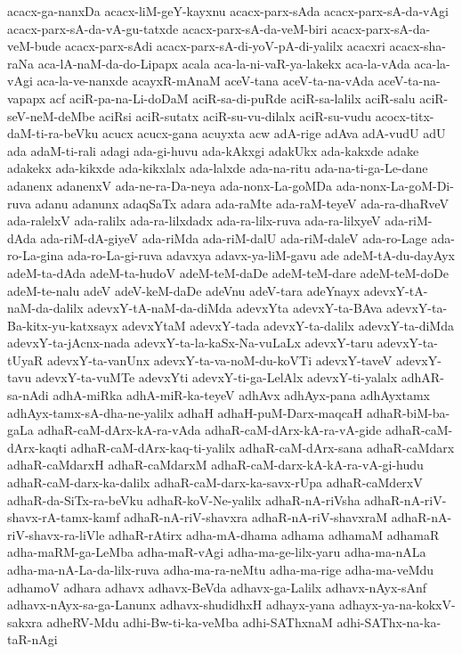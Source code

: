 {acacx-ga-nanxDa
acacx-liM-geY-kayxnu
acacx-parx-sAda
acacx-parx-sA-da-vAgi
acacx-parx-sA-da-vA-gu-tatxde
acacx-parx-sA-da-veM-biri
acacx-parx-sA-da-veM-bude
acacx-parx-sAdi
acacx-parx-sA-di-yoV-pA-di-yalilx
acacxri
acacx-sha-raNa
aca-lA-naM-da-do-Lipapx
acala
aca-la-ni-vaR-ya-lakekx
aca-la-vAda
aca-la-vAgi
aca-la-ve-nanxde
acayxR-mAnaM
aceV-tana
aceV-ta-na-vAda
aceV-ta-na-vapapx
acf
aciR-pa-na-Li-doDaM
aciR-sa-di-puRde
aciR-sa-lalilx
aciR-salu
aciR-seV-neM-deMbe
aciRsi
aciR-sutatx
aciR-su-vu-dilalx
aciR-su-vudu
acocx-titx-daM-ti-ra-beVku
acucx
acucx-gana
acuyxta
acw
adA-rige
adAva
adA-vudU
adU
ada
adaM-ti-rali
adagi
ada-gi-huvu
ada-kAkxgi
adakUkx
ada-kakxde
adake
adakekx
ada-kikxde
ada-kikxlalx
ada-lalxde
ada-na-ritu
ada-na-ti-ga-Le-dane
adanenx
adanenxV
ada-ne-ra-Da-neya
ada-nonx-La-goMDa
ada-nonx-La-goM-Di-ruva
adanu
adanunx
adaqSaTx
adara
ada-raMte
ada-raM-teyeV
ada-ra-dhaRveV
ada-ralelxV
ada-ralilx
ada-ra-lilxdadx
ada-ra-lilx-ruva
ada-ra-lilxyeV
ada-riM-dAda
ada-riM-dA-giyeV
ada-riMda
ada-riM-dalU
ada-riM-daleV
ada-ro-Lage
ada-ro-La-gina
ada-ro-La-gi-ruva
adavxya
adavx-ya-liM-gavu
ade
adeM-tA-du-dayAyx
adeM-ta-dAda
adeM-ta-hudoV
adeM-teM-daDe
adeM-teM-dare
adeM-teM-doDe
adeM-te-nalu
adeV
adeV-keM-daDe
adeVnu
adeV-tara
adeYnayx
adevxY-tA-naM-da-dalilx
adevxY-tA-naM-da-diMda
adevxYta
adevxY-ta-BAva
adevxY-ta-Ba-kitx-yu-katxsayx
adevxYtaM
adevxY-tada
adevxY-ta-dalilx
adevxY-ta-diMda
adevxY-ta-jAcnx-nada
adevxY-ta-la-kaSx-Na-vuLaLx
adevxY-taru
adevxY-ta-tUyaR
adevxY-ta-vanUnx
adevxY-ta-va-noM-du-koVTi
adevxY-taveV
adevxY-tavu
adevxY-ta-vuMTe
adevxYti
adevxY-ti-ga-LelAlx
adevxY-ti-yalalx
adhAR-sa-nAdi
adhA-miRka
adhA-miR-ka-teyeV
adhAvx
adhAyx-pana
adhAyxtamx
adhAyx-tamx-sA-dha-ne-yalilx
adhaH
adhaH-puM-Darx-maqcaH
adhaR-biM-ba-gaLa
adhaR-caM-dArx-kA-ra-vAda
adhaR-caM-dArx-kA-ra-vA-gide
adhaR-caM-dArx-kaqti
adhaR-caM-dArx-kaq-ti-yalilx
adhaR-caM-dArx-sana
adhaR-caMdarx
adhaR-caMdarxH
adhaR-caMdarxM
adhaR-caM-darx-kA-kA-ra-vA-gi-hudu
adhaR-caM-darx-ka-dalilx
adhaR-caM-darx-ka-savx-rUpa
adhaR-caMderxV
adhaR-da-SiTx-ra-beVku
adhaR-koV-Ne-yalilx
adhaR-nA-riVsha
adhaR-nA-riV-shavx-rA-tamx-kamf
adhaR-nA-riV-shavxra
adhaR-nA-riV-shavxraM
adhaR-nA-riV-shavx-ra-liVle
adhaR-rAtirx
adha-mA-dhama
adhama
adhamaM
adhamaR
adha-maRM-ga-LeMba
adha-maR-vAgi
adha-ma-ge-lilx-yaru
adha-ma-nALa
adha-ma-nA-La-da-lilx-ruva
adha-ma-ra-neMtu
adha-ma-rige
adha-ma-veMdu
adhamoV
adhara
adhavx
adhavx-BeVda
adhavx-ga-Lalilx
adhavx-nAyx-sAnf
adhavx-nAyx-sa-ga-Lanunx
adhavx-shudidhxH
adhayx-yana
adhayx-ya-na-kokxV-sakxra
adheRV-Mdu
adhi-Bw-ti-ka-veMba
adhi-SAThxnaM
adhi-SAThx-na-ka-taR-nAgi
}
